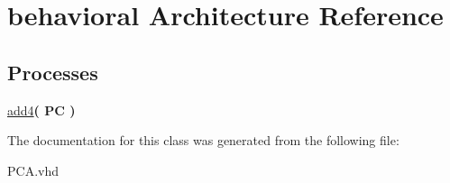 \hypertarget{class_p_c_a_1_1behavioral}{\section{behavioral \-Architecture \-Reference}
\label{class_p_c_a_1_1behavioral}
}
\*
\*
\subsection*{\-Processes}
 \begin{DoxyCompactItemize}
\item 
\hypertarget{class_p_c_a_1_1behavioral_ac44787d62097140cca1aae1e41a2a8b7}{\hyperlink{class_p_c_a_1_1behavioral_ac44787d62097140cca1aae1e41a2a8b7}{add4}{\bfseries  ( {\bfseries \-P\-C  } )}}\label{class_p_c_a_1_1behavioral_ac44787d62097140cca1aae1e41a2a8b7}

\end{DoxyCompactItemize}


\-The documentation for this class was generated from the following file\-:\begin{DoxyCompactItemize}
\item 
\-P\-C\-A.\-vhd\end{DoxyCompactItemize}
